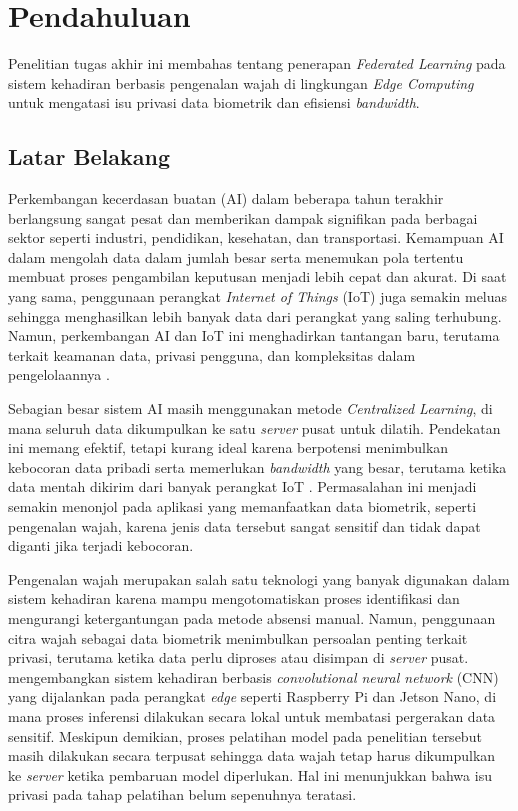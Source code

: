 \chapter{Pendahuluan}
\label{chap:pendahuluan}

Penelitian tugas akhir ini membahas tentang penerapan \textit{Federated Learning} pada sistem kehadiran berbasis pengenalan wajah di lingkungan \textit{Edge Computing} untuk mengatasi isu privasi data biometrik dan efisiensi \textit{bandwidth}.

\section{Latar Belakang}
\label{sec:latar-belakang}

Perkembangan kecerdasan buatan (AI) dalam beberapa tahun terakhir berlangsung sangat pesat dan memberikan dampak signifikan pada berbagai sektor seperti industri, pendidikan, kesehatan, dan transportasi. Kemampuan AI dalam mengolah data dalam jumlah besar serta menemukan pola tertentu membuat proses pengambilan keputusan menjadi lebih cepat dan akurat. Di saat yang sama, penggunaan perangkat \textit{Internet of Things} (IoT) juga semakin meluas sehingga menghasilkan lebih banyak data dari perangkat yang saling terhubung. Namun, perkembangan AI dan IoT ini menghadirkan tantangan baru, terutama terkait keamanan data, privasi pengguna, dan kompleksitas dalam pengelolaannya \parencite{Brecko2022}.

Sebagian besar sistem AI masih menggunakan metode \textit{Centralized Learning}, di mana seluruh data dikumpulkan ke satu \textit{server} pusat untuk dilatih. Pendekatan ini memang efektif, tetapi kurang ideal karena berpotensi menimbulkan kebocoran data pribadi serta memerlukan \textit{bandwidth} yang besar, terutama ketika data mentah dikirim dari banyak perangkat IoT \parencite{Nandi2023}. Permasalahan ini menjadi semakin menonjol pada aplikasi yang memanfaatkan data biometrik, seperti pengenalan wajah, karena jenis data tersebut sangat sensitif dan tidak dapat diganti jika terjadi kebocoran.

Pengenalan wajah merupakan salah satu teknologi yang banyak digunakan dalam sistem kehadiran karena mampu mengotomatiskan proses identifikasi dan mengurangi ketergantungan pada metode absensi manual. Namun, penggunaan citra wajah sebagai data biometrik menimbulkan persoalan penting terkait privasi, terutama ketika data perlu diproses atau disimpan di \textit{server} pusat. \textcite{Srinu2025} mengembangkan sistem kehadiran berbasis \textit{convolutional neural network} (CNN) yang dijalankan pada perangkat \textit{edge} seperti Raspberry Pi dan Jetson Nano, di mana proses inferensi dilakukan secara lokal untuk membatasi pergerakan data sensitif. Meskipun demikian, proses pelatihan model pada penelitian tersebut masih dilakukan secara terpusat sehingga data wajah tetap harus dikumpulkan ke \textit{server} ketika pembaruan model diperlukan. Hal ini menunjukkan bahwa isu privasi pada tahap pelatihan belum sepenuhnya teratasi.

